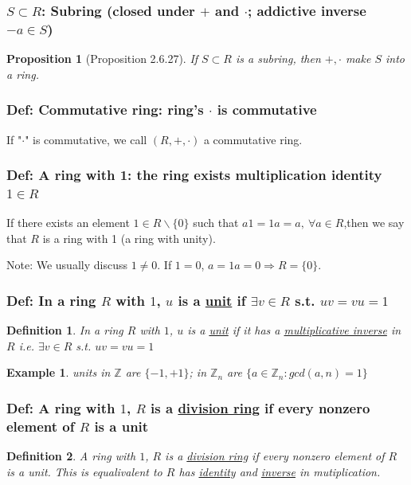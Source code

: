 \documentclass[11pt,a4paper]{article}
\newtheorem{proposition}{Proposition}
\newtheorem{example}{Example}
\newtheorem{definition}{Definition}
\begin{document}
\subsubsection{$S\subset R$: Subring (closed under $+$ and $\cdot$; addictive inverse $-a\in S$)}
\begin{proposition}[Proposition 2.6.27]
    If $S\subset R$ is a subring, then $+,\cdot$ make $S$ into a ring.
\end{proposition}

\subsubsection{Def: Commutative ring: ring's $\cdot$ is commutative}
If "$\cdot$" is commutative, we call $(R, +, \cdot)$ a commutative ring.
\subsubsection{Def: A ring with 1: the ring exists multiplication identity $1\in R$}
If there exists an element $1\in R\backslash \{0\}$ such that $a1=1a=a,\ \forall a\in R$,then we say that $R$ is a ring with 1 (a ring with unity).

Note: We usually discuss $1\neq 0$. If $1=0$, $a=1a=0 \Rightarrow R=\{0\}$.

\subsubsection{Def: In a ring $R$ with $1$, $u$ is a \underline{unit} if $\exists v\in R$ s.t. $uv=vu=1$}
\begin{definition}
    In a ring $R$ with $1$, $u$ is a \underline{unit} if it has a \underline{multiplicative
    inverse} in $R$ i.e. $\exists v\in R$ s.t. $uv=vu=1$
\end{definition}
\begin{example}
    units in $\mathbb{Z}$ are $\{-1,+1\}$; in $\mathbb{Z}_n$ are $\{a\in \mathbb{Z}_n:gcd(a,n)=1\}$
\end{example}

\subsubsection{Def: A ring with $1$, $R$ is a \underline{division ring} if every nonzero element of $R$ is a unit}
\begin{definition}
    A ring with $1$, $R$ is a \underline{division ring} if every nonzero element of $R$ is a unit. This is equalivalent to $R$ has \underline{identity} and \underline{inverse} in mutiplication.
\end{definition}
\end{document}
